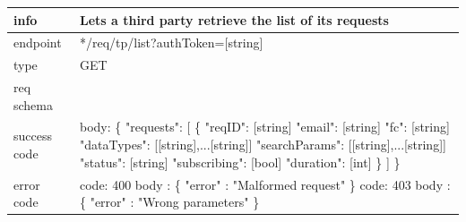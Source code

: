 \documentclass[titlepage]{article}
\begin{document}
\begin{tabularx}{\textwidth}{lX} \hline
    info & Lets a third party retrieve the list of its requests \\ \hline
    endpoint & */req/tp/list?authToken=[string] \\ \hline
    type & GET \\ \hline
    req schema & \\ \hline
    success code & body: \{ \newline
    "requests": [ \newline
    \{ \newline
    "reqID": [string] \newline
    "email": [string] \newline
    "fc": [string] \newline
    "dataTypes": [[string],...[string]] \newline
    "searchParams": [[string],...[string]] \newline
    "status": [string] \newline
    "subscribing": [bool] \newline
    "duration": [int] \newline
    \} \newline
    ] \newline
    \} \\ \hline
    error code &
        code: 400 \newline
        body : \{ "error" : "Malformed request" \} \newline \newline
        code: 403 \newline
        body : \{ "error" : "Wrong parameters" \}
\end{tabularx}
		
\vspace{\baselineskip}
\end{document}
